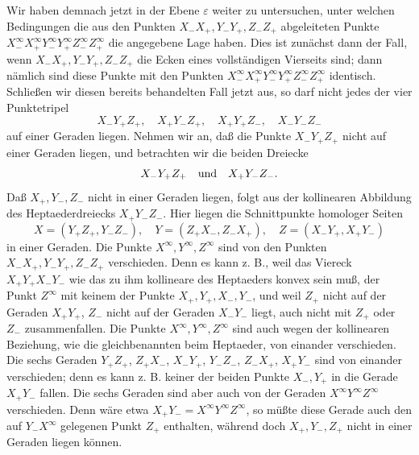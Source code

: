 \documentclass[11pt,a4paper]{article}
\begin{document}
Wir haben demnach jetzt in der Ebene $\varepsilon$ weiter zu untersuchen, unter welchen Bedingungen die aus den Punkten $X_-X_+,Y_-Y_+,Z_-Z_+$ abgeleiteten Punkte $X_-^\infty X_+^\infty Y_-^\infty Y_+^\infty Z_-^\infty Z_+^\infty$ die angegebene Lage haben. Dies ist zun\"achst dann der Fall, wenn $X_-X_+,Y_-Y_+,Z_-Z_+$ die Ecken eines vollst\"andigen Vierseits sind; dann n\"amlich sind diese Punkte mit den Punkten $X_-^\infty X_+^\infty Y_-^\infty Y_+^\infty Z_-^\infty Z_+^\infty$ identisch. Schlie\ss{}en wir diesen bereits behandelten Fall jetzt aus, so darf nicht jedes der vier Punktetripel
\[
 X_-Y_+Z_+,
 \quad X_+Y_-Z_+,
 \quad X_+Y_+Z_-,
 \quad X_-Y_-Z_-
\]
auf einer Geraden liegen. Nehmen wir an, da\ss{} die Punkte $X_-Y_+Z_+$ nicht auf einer Geraden liegen, und betrachten wir die beiden Dreiecke
\[
 X_-Y_+Z_+
 \quad\hbox{und}\quad
 X_+Y_-Z_-.
\]
Da\ss{} $X_+,Y_-,Z_-$ nicht in einer Geraden liegen, folgt aus der kollinearen Abbildung des Heptaederdreiecks $X_+Y_-Z_-$. Hier liegen die Schnittpunkte homologer Seiten
\[
 X=(Y_+Z_+,Y_-Z_-),
 \quad Y=(Z_+X_-,Z_-X_+),
 \quad Z=(X_-Y_+,X_+Y_-)
\]
in einer Geraden. Die Punkte $X^\infty,Y^\infty,Z^\infty$ sind von den Punkten $X_-X_+,Y_-Y_+,Z_-Z_+$ verschieden. Denn es kann z. B., weil das Viereck $X_+Y_+X_-Y_-$ wie das zu ihm kollineare des Heptaeders konvex sein mu\ss{}, der Punkt $Z^\infty$ mit keinem der Punkte $X_+,Y_+,X_-,Y_-$, und weil $Z_+$ nicht auf der Geraden $X_+Y_+$, $Z_-$ nicht auf der Geraden $X_-Y_-$ liegt, auch nicht mit $Z_+$ oder $Z_-$ zusammenfallen. Die Punkte $X^\infty,Y^\infty,Z^\infty$ sind auch wegen der kollinearen Beziehung, wie die gleichbenannten beim Heptaeder, von einander verschieden. Die sechs Geraden $Y_+Z_+$, $Z_+X_-$, $X_-Y_+$, $Y_-Z_-$, $Z_-X_+$, $X_+Y_-$ sind von einander verschieden; denn es kann z. B. keiner der beiden Punkte $X_-,Y_+$ in die Gerade $X_+Y_-$ fallen. Die sechs Geraden sind aber auch von der Geraden $X^\infty Y^\infty Z^\infty$ verschieden. Denn w\"are etwa $X_+Y_-=X^\infty Y^\infty Z^\infty$, so m\"u\ss{}te diese Gerade auch den auf $Y_-X^\infty$ gelegenen Punkt $Z_+$ enthalten, w\"ahrend doch $X_+,Y_-,Z_+$ nicht in einer Geraden liegen k\"onnen.
\end{document}
